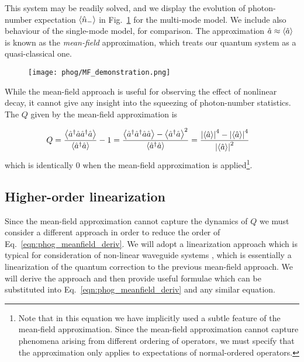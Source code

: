 This system may be readily solved, and we display the evolution of photon-number expectation $\ev{\hat{n}_-}$ in Fig.~\ref{fig:phog_MF_demonstration} for the multi-mode model. We include also behaviour of the single-mode model, for comparison. The approximation $\hat{a} \approx \ev{\hat{a}}$ is known as the \emph{mean-field} approximation, which treats our quantum system as a quasi-classical one.

\begin{figure}[htp]
\centering
\texttt{[image: phog/MF\_demonstration.png]}
\caption{\label{fig:phog_MF_demonstration}}
\end{figure}


While the mean-field approach is useful for observing the effect of nonlinear decay, it cannot give any insight into the squeezing of photon-number statistics. The $Q$ given by the mean-field approximation is 

\begin{align}
Q = \frac{\ev{\hat{a}^\dagger \hat{a} \hat{a}^\dagger \hat{a}}}{\ev{\hat{a}^\dagger \hat{a}}} - 1 &= \frac{\ev{\hat{a}^\dagger \hat{a}^\dagger \hat{a} \hat{a}} - \ev{\hat{a}^\dagger \hat{a}}^2}{\ev{\hat{a}^\dagger \hat{a}}} = \frac{\left|\ev{\hat{a}}\right|^4 - \left|\ev{\hat{a}}\right|^4}{\left|\ev{\hat{a}}\right|^2} \notag
\end{align}
which is identically $0$ when the mean-field approximation is applied\footnote{Note that in this equation we have implicitly used a subtle feature of the mean-field approximation. Since the mean-field approximation cannot capture phenomena arising from different ordering of operators, we must specify that the approximation only applies to expectations of normal-ordered operators.}.

\subsection{Higher-order linearization}\label{sec:linearization}
Since the mean-field approximation cannot capture the dynamics of $Q$ we must consider a different approach in order to reduce the order of Eq.~\ref{eqn:phog_meanfield_deriv}. We will adopt a linearization approach which is typical for consideration of non-linear waveguide systems \cite{Doerr1994, Haus1990,Ju2012}, which is essentially a linearization of the quantum correction to the previous mean-field approach. We will derive the approach and then provide useful formulae which can be substituted into Eq.~\ref{eqn:phog_meanfield_deriv} and any similar equation. 

